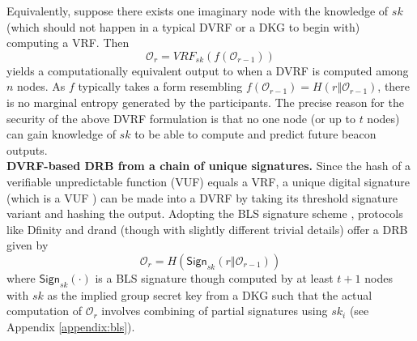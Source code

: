 \documentclass[conference]{IEEEtran}
\theoremstyle{definition}
\theoremstyle{remark}
\begin{document}
Equivalently, suppose there exists one imaginary node with the knowledge of $sk$ (which should not happen in a typical DVRF or a DKG to begin with) computing a VRF. Then
\[
\mathcal{O}_r = VRF_{sk}(f(\mathcal{O}_{r - 1}))
\]
yields a computationally equivalent output to when a DVRF is computed among $n$ nodes. As $f$ typically takes a form resembling $f(\mathcal{O}_{r - 1}) = H(r \mathbin\Vert \mathcal{O}_{r - 1})$, there is no marginal entropy generated by the participants. The precise reason for the security of the above DVRF formulation is that no one node (or up to $t$ nodes) can gain knowledge of $sk$ to be able to compute and predict future beacon outputs.\\

\noindent\textbf{DVRF-based DRB from a chain of unique signatures.} Since the hash of a verifiable unpredictable function (VUF) \cite{micali1999verifiable} equals a VRF, a unique digital signature (which is a VUF \cite{dodis2005verifiable}) can be made into a DVRF by taking its threshold signature variant \cite{boldyreva2003threshold} and hashing the output. Adopting the BLS signature scheme \cite{boneh2001short}, protocols like Dfinity \cite{hanke2018dfinity} and drand \cite{drand} (though with slightly different trivial details) offer a DRB given by
\[
\mathcal{O}_r = H(\mathsf{Sign}_{sk}(r \mathbin\Vert \mathcal{O}_{r - 1}))
\]
where $\mathsf{Sign}_{sk}(\cdot)$ is a BLS signature though computed by at least $t + 1$ nodes with $sk$ as the implied group secret key from a DKG such that the actual computation of $\mathcal{O}_r$ involves combining of partial signatures using $sk_i$ (see Appendix \ref{appendix:bls}).\\
\end{document}
